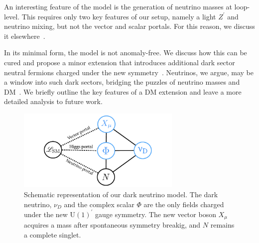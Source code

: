 An interesting feature of the model is the generation of neutrino masses at loop-level. This requires only two key features of our setup, namely a light $Z^\prime$ and neutrino mixing, but not the vector and scalar portals. For this reason, we discuss it elsewhere~\cite{Ballett:2019cqp}.

In its minimal form, the model is not anomaly-free. We discuss how this can be cured and propose a minor extension that introduces additional dark sector neutral fermions charged under the new symmetry~\cite{Boehm:2003hm,*Boehm:2003ha}. Neutrinos, we argue, may be a window into such dark sectors, bridging the puzzles of neutrino masses and DM~\cite{Ma:2006km,Farzan:2009ji,Farzan:2010mr,Arhrib:2015dez,Cherry:2014xra,Escudero:2016tzx,Escudero:2016ksa,Batell:2017cmf,Capozzi:2017auw,Campo:2017nwh,Blennow:2019fhy}. We briefly outline the key features of a DM extension and leave a more detailed analysis to future work.

%
\begin{figure}[t]
\centering\includegraphics[width=0.7\textwidth]{portals.pdf}
\caption[Dark neutrino model diagram.]{Schematic representation of our dark neutrino model. The dark neutrino, $\nu_{D}$ and the complex scalar $\Phi$ are the only fields charged under the new U$(1)^\prime$ gauge symmetry. The new vector boson $X_\mu$ acquires a mass after spontaneous symmetry breakig, and $N$ remains a complete singlet.
\label{fig:Tdiagrams}}
\end{figure}
%



